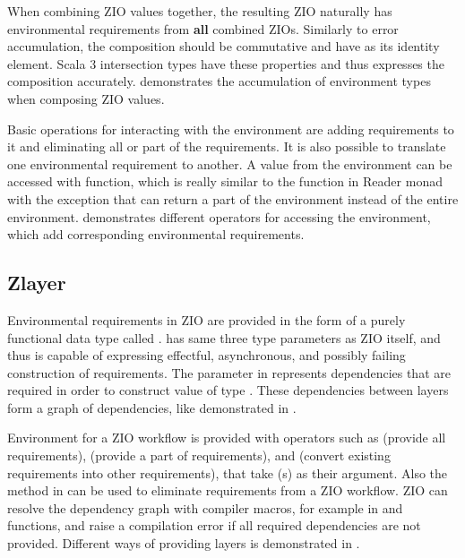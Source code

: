 

When combining ZIO values together, the resulting ZIO naturally has environmental requirements from \textbf{all} combined ZIOs. Similarly to error accumulation, the composition should be commutative and have  as its identity element. Scala 3 intersection types have these properties and thus expresses the composition accurately.  demonstrates the accumulation of environment types when composing ZIO values.

Basic operations for interacting with the environment are adding requirements to it and eliminating all or part of the requirements. It is also possible to translate one environmental requirement to another. A value from the environment can be accessed with  function, which is really similar to the  function in Reader monad with the exception that  can return a part of the environment instead of the entire environment.  demonstrates different operators for accessing the environment, which add corresponding environmental requirements.




\subsection{Zlayer}
Environmental requirements in ZIO are provided in the form of a purely functional data type called .  has same three type parameters as ZIO itself, and thus is capable of expressing effectful, asynchronous, and possibly failing construction of requirements. The  parameter in  represents dependencies that are required in order to construct value of type . These dependencies between layers form a graph of dependencies, like demonstrated in .



Environment for a ZIO workflow is provided with operators such as  (provide all requirements),  (provide a part of requirements), and  (convert existing requirements into other requirements), that take (s) as their argument. Also the  method in  can be used to eliminate requirements from a ZIO workflow. ZIO can resolve the dependency graph with compiler macros, for example in  and  functions, and raise a compilation error if all required dependencies are not provided. Different ways of providing layers is demonstrated in .

